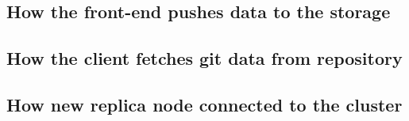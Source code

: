 \subsection{How the front-end pushes data to the storage}


\subsection{How the client fetches git data from repository}

\subsection{How new replica node connected to the cluster}

